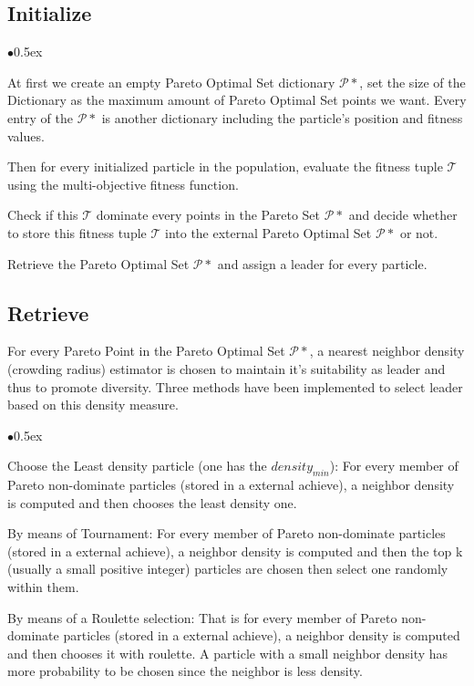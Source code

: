 \documentclass[12pt, runningheads,a4paper]{llncs}
\begin{document}
\subsection{Initialize}
\begin{list}{$\bullet$}{\itemsep 0.5ex}

\item At first we create an empty Pareto Optimal Set dictionary $\mathcal{P}*$, set the size of the Dictionary as the maximum amount of Pareto Optimal Set points we want. Every entry of the $\mathcal{P}*$ is another dictionary including the particle's position and fitness values.
\item Then for every initialized particle in the population, evaluate the fitness tuple $\mathcal{T}$ using the multi-objective fitness function.
\item Check if this $\mathcal{T}$ dominate every points in the Pareto Set $\mathcal{P}*$ and decide whether to store this fitness tuple $\mathcal{T}$ into the external Pareto Optimal Set $\mathcal{P}*$ or not.
\item Retrieve the Pareto Optimal Set $\mathcal{P}*$ and assign a leader for every particle.
\end{list}

\subsection{Retrieve}

   For every Pareto Point in the Pareto Optimal Set $\mathcal{P}*$, a nearest neighbor density (crowding radius) estimator is chosen to maintain it's suitability as leader and thus to promote diversity. Three methods have been implemented to select leader based on this density measure.
\begin{list}{$\bullet$}{\itemsep 0.5ex}
\item Choose the Least density particle (one has the $density_{min}$): For every member of Pareto non-dominate particles (stored in a external achieve), a neighbor density is computed and then chooses the least density one.
\item By means of Tournament: For every member of Pareto non-dominate particles (stored in a external achieve), a neighbor density is computed and then the top k (usually a small positive integer) particles are chosen then select one randomly within them.
\item By means of a Roulette selection: That is for every member of Pareto non-dominate particles (stored in a external achieve), a neighbor density is computed and then chooses it with roulette. A particle with a small neighbor density has more probability to be chosen since the neighbor is less density.
\end{list}
\end{document}
